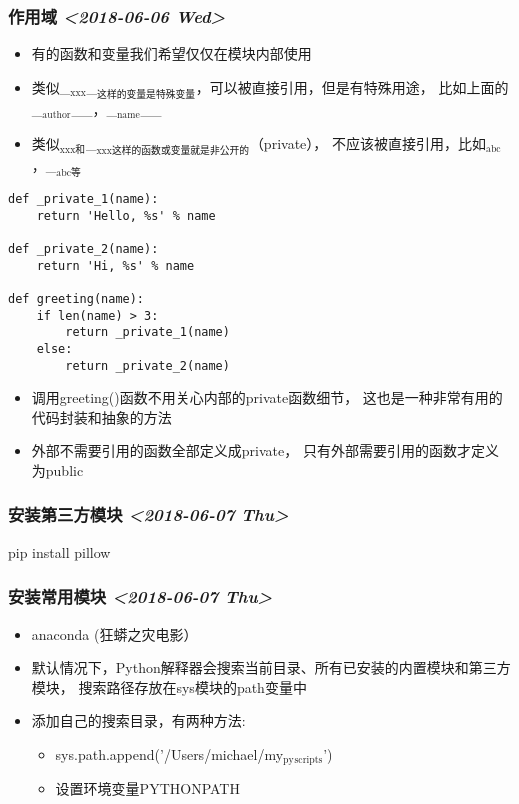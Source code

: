 \documentclass[11pt]{article}
\begin{document}
\subsubsection{作用域 \textit{<2018-06-06 Wed>}}
\label{sec:org8cf4cf7}
\begin{itemize}
\item 有的函数和变量我们希望仅仅在模块内部使用
\item 类似\_\(_{\text{xxx}}\)\_\(_{\text{这样的变量是特殊变量}}\)，可以被直接引用，但是有特殊用途，
比如上面的\_\(_{\text{author}}\)\_\_，\_\(_{\text{name}}\)\_\_
\item 类似\(_{\text{xxx和}}\)\_\(_{\text{xxx这样的函数或变量就是非公开的}}\)（private），
不应该被直接引用，比如\(_{\text{abc}}\)，\_\(_{\text{abc等}}\)
\end{itemize}
\begin{verbatim}
def _private_1(name):
    return 'Hello, %s' % name

def _private_2(name):
    return 'Hi, %s' % name

def greeting(name):
    if len(name) > 3:
        return _private_1(name)
    else:
        return _private_2(name)
\end{verbatim}
\begin{itemize}
\item 调用greeting()函数不用关心内部的private函数细节，
这也是一种非常有用的代码封装和抽象的方法
\item 外部不需要引用的函数全部定义成private，
只有外部需要引用的函数才定义为public
\end{itemize}
\subsubsection{安装第三方模块 \textit{<2018-06-07 Thu>}}
\label{sec:org32b1075}
pip install pillow
\subsubsection{安装常用模块 \textit{<2018-06-07 Thu>}}
\label{sec:org6bc7635}
\begin{itemize}
\item anaconda (狂蟒之灾电影）
\item 默认情况下，Python解释器会搜索当前目录、所有已安装的内置模块和第三方模块，
搜索路径存放在sys模块的path变量中
\item 添加自己的搜索目录，有两种方法:
\begin{itemize}
\item sys.path.append('/Users/michael/my\(_{\text{py}}\)\(_{\text{scripts}}\)')
\item 设置环境变量PYTHONPATH
\end{itemize}
\end{itemize}
\end{document}
